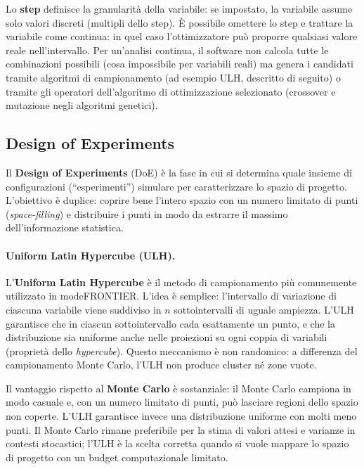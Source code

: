 Lo \textbf{step} definisce la granularità della variabile: se impostato,
la variabile assume solo valori discreti (multipli dello step).
È possibile omettere lo step e trattare la variabile come continua:
in quel caso l'ottimizzatore può proporre qualsiasi valore reale
nell'intervallo.
Per un'analisi continua, il software non calcola tutte le combinazioni
possibili (cosa impossibile per variabili reali) ma genera i candidati
tramite algoritmi di campionamento (ad esempio ULH, descritto di
seguito) o tramite gli operatori dell'algoritmo di ottimizzazione
selezionato (crossover e mutazione negli algoritmi genetici).

\subsection{Design of Experiments}

Il \textbf{Design of Experiments} (DoE) è la fase in cui si determina
quale insieme di configurazioni (``esperimenti'') simulare per
caratterizzare lo spazio di progetto.
L'obiettivo è duplice: coprire bene l'intero spazio con un numero
limitato di punti (\textit{space-filling}) e distribuire i punti in
modo da estrarre il massimo dell'informazione statistica.

\paragraph{Uniform Latin Hypercube (ULH).}
L'\textbf{Uniform Latin Hypercube} è il metodo di campionamento più
comunemente utilizzato in modeFRONTIER.
L'idea è semplice: l'intervallo di variazione di ciascuna variabile
viene suddiviso in $n$ sottointervalli di uguale ampiezza.
L'ULH garantisce che in ciascun sottointervallo cada esattamente un
punto, e che la distribuzione sia uniforme anche nelle proiezioni su
ogni coppia di variabili (proprietà dello \textit{hypercube}).
Questo meccanismo è non randomico: a differenza del campionamento
Monte Carlo, l'ULH non produce cluster né zone vuote.

Il vantaggio rispetto al \textbf{Monte Carlo} è sostanziale: il Monte
Carlo campiona in modo casuale e, con un numero limitato di punti, può
lasciare regioni dello spazio non coperte.
L'ULH garantisce invece una distribuzione uniforme con molti meno punti.
Il Monte Carlo rimane preferibile per la stima di valori attesi e
varianze in contesti stocastici; l'ULH è la scelta corretta quando
si vuole mappare lo spazio di progetto con un budget computazionale
limitato.

